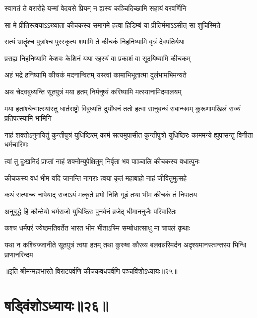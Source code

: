 


\twolineshloka
{स्वागतं ते वरारोहे यन्मां वेदयसे प्रियम्}
{न ह्यस्य कञ्चिदिच्छामि सहायं वरवर्णिनि}


\twolineshloka
{सा मे प्रीतिस्त्वयाऽऽख्याता कीचकस्य समागमे}
{हत्वा हिडिम्बं या प्रीतिर्ममाऽऽसीत् सा शुचिस्मिते}


\twolineshloka
{सत्यं भ्रातॄंश्च पुत्रांश्च पुरस्कृत्य शपामि ते}
{कीचकं निहनिष्यामि वृत्रं देवपतिर्यथा}


\twolineshloka
{प्रसह्य निहनिष्यामि केशवः केशिनं यथा}
{रहस्यं वा प्रकाशं वा सूदयिष्यामि कीचकम्}


\twolineshloka
{अहं भद्रे हनिष्यामि कीचकं मदनान्वितम्}
{यस्त्वां कामाभिभूतात्मा दुर्लभामभिमन्यते}


\twolineshloka
{अथ चेदवबुध्यन्ति सूतपुत्रं मया हतम्}
{निर्मनुष्यं करिष्यामि मत्स्यानामिदमालयम्}


\threelineshloka
{मया हतांश्चेन्मात्स्यांस्तु धार्तराष्ट्रो विबुध्यति}
{दुर्योधनं ततो हत्वा सानुबन्धं सबान्धवम्}
{कुरूणामखिलं राज्यं प्रतिपत्स्यामि भामिनि}


\threelineshloka
{नाहं शक्तोऽनुनयितुं कुन्तीपुत्रं युधिष्ठिरम्}
{कामं सत्यमुपासीत कुन्तीपुत्रो युधिष्ठिरः}
{काममन्ये ह्युपासन्तु विनीता धर्मचारिणः}


\twolineshloka
{त्वां तु दुःखमिदं प्राप्तां नाहं शक्नोम्युपेक्षितुम्}
{निर्वृता भव पाञ्चालि कीचकस्य वधात्पुनः}




\twolineshloka
{कीचकस्य वधं भीम यदि जानन्ति नागराः}
{त्वया कृतं महाबाहो नाहं जीवितुमुत्सहे}


\twolineshloka
{कथं सत्याच्च नापेयाद् राजाऽयं मत्कृते प्रभो}
{निशि गूढं तथा भीम कीचकं तं निपातय}


\twolineshloka
{अनुबुद्धे हि कौन्तेयो धर्मराजो युधिष्ठिरः}
{पुनर्वनं व्रजेद् धीमाननुजैः परिवारितः}


\twolineshloka
{कश्च धर्मपरं ज्येष्ठमतिवर्तेत भारत}
{भीम भीताऽस्मि सम्बोधात्साधु मा चापलं कृथाः}


\threelineshloka
{यथा न कश्चिज्जानीते सूतपुत्रं त्वया हतम्}
{तथा कुरुष्व कौरव्य बलवन्नरिमर्दन}
{अदृश्यमानस्त्वन्तस्य भिन्धि प्राणानरिन्दम}

॥इति श्रीमन्महाभारते विराटपर्वणि कीचकवधपर्वणि पञ्चविंशोऽध्यायः॥२५॥

\chapter{षड्विंशोऽध्यायः॥२६॥}

